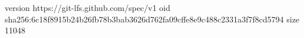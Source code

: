 version https://git-lfs.github.com/spec/v1
oid sha256:6c18f8915b24b26fb78b3bab3626d762fa09cffe8e9c488c2331a3f7f8cd5794
size 11048
